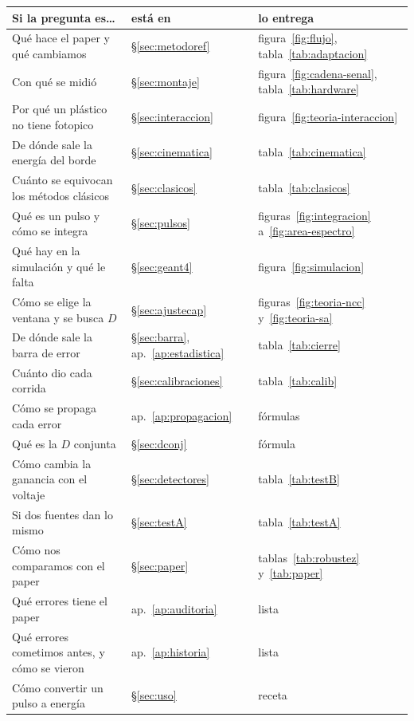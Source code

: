 \documentclass[11pt,a4paper]{article}
\begin{document}
\begin{center}
\small
\begin{tabular}{lll}
\toprule
\textbf{Si la pregunta es\ldots} & \textbf{está en} & \textbf{lo entrega} \\
\midrule
Qué hace el paper y qué cambiamos & \S\ref{sec:metodoref} &
   figura~\ref{fig:flujo}, tabla~\ref{tab:adaptacion} \\
Con qué se midió & \S\ref{sec:montaje} &
   figura~\ref{fig:cadena-senal}, tabla~\ref{tab:hardware} \\
Por qué un plástico no tiene fotopico & \S\ref{sec:interaccion} &
   figura~\ref{fig:teoria-interaccion} \\
De dónde sale la energía del borde & \S\ref{sec:cinematica} &
   tabla~\ref{tab:cinematica} \\
Cuánto se equivocan los métodos clásicos & \S\ref{sec:clasicos} &
   tabla~\ref{tab:clasicos} \\
Qué es un pulso y cómo se integra & \S\ref{sec:pulsos} &
   figuras~\ref{fig:integracion} a~\ref{fig:area-espectro} \\
Qué hay en la simulación y qué le falta & \S\ref{sec:geant4} &
   figura~\ref{fig:simulacion} \\
Cómo se elige la ventana y se busca $D$ & \S\ref{sec:ajustecap} &
   figuras~\ref{fig:teoria-ncc} y~\ref{fig:teoria-sa} \\
De dónde sale la barra de error & \S\ref{sec:barra}, ap.~\ref{ap:estadistica} &
   tabla~\ref{tab:cierre} \\
Cuánto dio cada corrida & \S\ref{sec:calibraciones} & tabla~\ref{tab:calib} \\
Cómo se propaga cada error & ap.~\ref{ap:propagacion} & fórmulas \\
Qué es la $D$ conjunta & \S\ref{sec:dconj} & fórmula \\
Cómo cambia la ganancia con el voltaje & \S\ref{sec:detectores} &
   tabla~\ref{tab:testB} \\
Si dos fuentes dan lo mismo & \S\ref{sec:testA} & tabla~\ref{tab:testA} \\
Cómo nos comparamos con el paper & \S\ref{sec:paper} &
   tablas~\ref{tab:robustez} y~\ref{tab:paper} \\
Qué errores tiene el paper & ap.~\ref{ap:auditoria} & lista \\
Qué errores cometimos antes, y cómo se vieron & ap.~\ref{ap:historia} & lista \\
Cómo convertir un pulso a energía & \S\ref{sec:uso} & receta \\
\bottomrule
\end{tabular}
\end{center}
\end{document}
